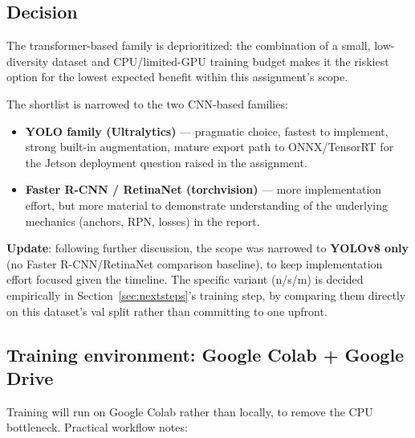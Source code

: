 \documentclass[11pt,a4paper]{article}
\begin{document}
\subsection{Decision}

The transformer-based family is deprioritized: the combination of a small, low-diversity
dataset and CPU/limited-GPU training budget makes it the riskiest option for the
lowest expected benefit within this assignment's scope.

The shortlist is narrowed to the two CNN-based families:
\begin{itemize}[nosep]
    \item \textbf{YOLO family (Ultralytics)} --- pragmatic choice, fastest to implement,
          strong built-in augmentation, mature export path to ONNX/TensorRT for the Jetson
          deployment question raised in the assignment.
    \item \textbf{Faster R-CNN / RetinaNet (torchvision)} --- more implementation effort, but
          more material to demonstrate understanding of the underlying mechanics (anchors, RPN,
          losses) in the report.
\end{itemize}

\textbf{Update}: following further discussion, the scope was narrowed to \textbf{YOLOv8 only}
(no Faster R-CNN/RetinaNet comparison baseline), to keep implementation effort focused given the
timeline. The specific variant (n/s/m) is decided empirically in
Section~\ref{sec:nextsteps}'s training step, by comparing them directly on this dataset's val
split rather than committing to one upfront.

\subsection{Training environment: Google Colab + Google Drive}

Training will run on Google Colab rather than locally, to remove the CPU bottleneck. Practical
workflow notes:
\end{document}
